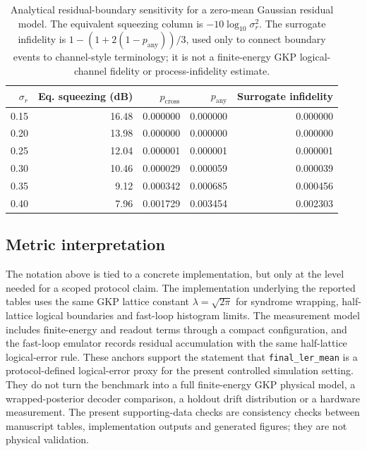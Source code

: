\documentclass[11pt]{article}
\newcommand{\softwarehil}{controlled simulation}
\newcommand{\finalLER}{\texttt{final\_ler\_mean}}
\begin{document}
\begin{table}[htbp]
\centering
\small
\begin{tabular}{@{}rrrrr@{}}
\toprule
\(\sigma_r\) & Eq. squeezing (dB) & \(p_{\mathrm{cross}}\) & \(p_{\mathrm{any}}\) & Surrogate infidelity \\
\midrule
0.15 & 16.48 & 0.000000 & 0.000000 & 0.000000 \\
0.20 & 13.98 & 0.000000 & 0.000000 & 0.000000 \\
0.25 & 12.04 & 0.000001 & 0.000001 & 0.000001 \\
0.30 & 10.46 & 0.000029 & 0.000059 & 0.000039 \\
0.35 & 9.12 & 0.000342 & 0.000685 & 0.000456 \\
0.40 & 7.96 & 0.001729 & 0.003454 & 0.002303 \\
\bottomrule
\end{tabular}
\caption{Analytical residual-boundary sensitivity for a zero-mean Gaussian
residual model.  The equivalent squeezing column is
\(-10\log_{10}\sigma_r^2\).  The surrogate infidelity is
\(1-(1+2(1-p_{\mathrm{any}}))/3\), used only to connect boundary events to
channel-style terminology; it is not a finite-energy GKP logical-channel
fidelity or process-infidelity estimate.}
\label{tab:gkp-boundary-sensitivity}
\end{table}

\subsection{Metric interpretation}

The notation above is tied to a concrete implementation, but only at
the level needed for a scoped protocol claim.  The implementation underlying the
reported tables uses the same GKP lattice constant \(\lambda=\sqrt{2\pi}\) for
syndrome wrapping, half-lattice logical boundaries and fast-loop histogram
limits.  The measurement model
includes finite-energy and readout terms through a compact configuration, and
the fast-loop emulator records residual accumulation with the same half-lattice
logical-error rule.  These anchors support the statement that \finalLER{} is a
protocol-defined logical-error proxy for the present \softwarehil{} setting.
They do not turn the benchmark into a full finite-energy GKP physical
model, a wrapped-posterior decoder comparison, a holdout drift distribution or
a hardware measurement.  The present supporting-data checks are consistency
checks between manuscript tables, implementation outputs and generated figures; they are
not physical validation.
\end{document}
